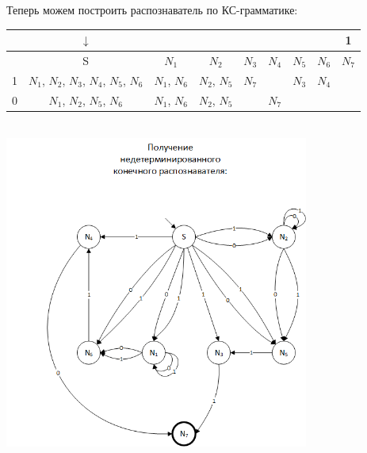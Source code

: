 \documentclass[a4paper,14pt]{extarticle}
\begin{document}
\begin{enumerate}[1.]
Теперь можем построить распознаватель по КС-грамматике:\\

\begin{tabular}{|c|c|c|c|c|c|c|c|c|}
\hline
& $\downarrow$ &  &&&&&&1\\
\hline
  & S & $N_1$ & $N_2$ & $N_3$ & $N_4$ & $N_5$ & $N_6$ & $N_7$ \\
  \hline
1 & $N_1$, $N_2$, $N_3$, $N_4$, $N_5$, $N_6$ & $N_1$, $N_6$ & $N_2$, $N_5$ & $N_7$ & & $N_3$ & $N_4$ & \\
\hline
0 & $N_1$, $N_2$, $N_5$, $N_6$ & $N_1$, $N_6$ & $N_2$, $N_5$ & & $N_7$ & & & \\
\hline

\end{tabular}\\
\includegraphics[width=100mm]{task1_non_determined}


\end{enumerate}
\end{document}
